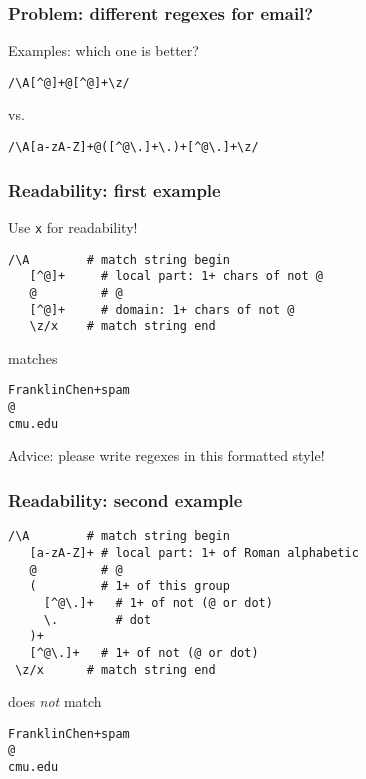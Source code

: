 \begin{frame}[fragile]
  \frametitle{Problem: different regexes for email?}

  Examples: which one is better?

  \begin{verbatim}
/\A[^@]+@[^@]+\z/
  \end{verbatim}

  vs.
  
  \begin{verbatim}
/\A[a-zA-Z]+@([^@\.]+\.)+[^@\.]+\z/
  \end{verbatim}
\end{frame}

\begin{frame}[fragile]
  \frametitle{Readability: first example}

  Use \texttt{x} for readability!

  \begin{verbatim}
/\A        # match string begin
   [^@]+     # local part: 1+ chars of not @
   @         # @
   [^@]+     # domain: 1+ chars of not @
   \z/x    # match string end
  \end{verbatim}

  matches

  \begin{verbatim}
FranklinChen+spam
@
cmu.edu
  \end{verbatim}

  Advice: please write regexes in this formatted style!
\end{frame}

\begin{frame}[fragile]
  \frametitle{Readability: second example}

  \begin{verbatim}
/\A        # match string begin
   [a-zA-Z]+ # local part: 1+ of Roman alphabetic
   @         # @
   (         # 1+ of this group
     [^@\.]+   # 1+ of not (@ or dot)
     \.        # dot
   )+
   [^@\.]+   # 1+ of not (@ or dot)
 \z/x      # match string end
  \end{verbatim}

  does \emph{not} match

  \begin{verbatim}
FranklinChen+spam
@
cmu.edu
  \end{verbatim}
\end{frame}


